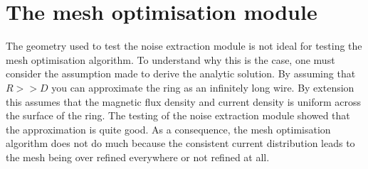 \section{The mesh optimisation module}
The geometry used to test the noise extraction module is not ideal for testing the mesh optimisation algorithm. To understand why this is the case, one must consider the assumption made to derive the analytic solution. By assuming that $R >> D$ you can approximate the ring as an infinitely long wire. By extension this assumes that the magnetic flux density and current density is uniform across the surface of the ring. The testing of the noise extraction module showed that the approximation is quite good. As a consequence, the mesh optimisation algorithm does not do much because the consistent current distribution leads to the mesh being over refined everywhere or not refined at all.
